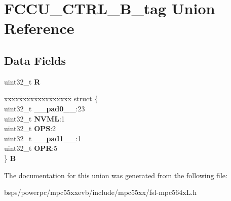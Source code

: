 \hypertarget{unionFCCU__CTRL__32B__tag}{}\section{F\+C\+C\+U\+\_\+\+C\+T\+R\+L\+\_\+B\+\_\+tag Union Reference}
\label{unionFCCU__CTRL__32B__tag}
\subsection*{Data Fields}
\begin{DoxyCompactItemize}
\item 
\mbox{\label{unionFCCU__CTRL__32B__tag_abbc515d88332dde7ecdce28fccee6cf2}} 
uint32\+\_\+t {\bfseries R}
\item 
\mbox{\label{unionFCCU__CTRL__32B__tag_a194afdc0954f1dfa8aad7239c25c3af8}} 
\begin{tabbing}
xx\=xx\=xx\=xx\=xx\=xx\=xx\=xx\=xx\=\kill
struct \{\\
\>uint32\_t {\bfseries \_\_pad0\_\_}:23\\
\>uint32\_t {\bfseries NVML}:1\\
\>uint32\_t {\bfseries OPS}:2\\
\>uint32\_t {\bfseries \_\_pad1\_\_}:1\\
\>uint32\_t {\bfseries OPR}:5\\
\} {\bfseries B}\\

\end{tabbing}\end{DoxyCompactItemize}


The documentation for this union was generated from the following file\+:\begin{DoxyCompactItemize}
\item 
bsps/powerpc/mpc55xxevb/include/mpc55xx/fsl-\/mpc564x\+L.\+h\end{DoxyCompactItemize}
